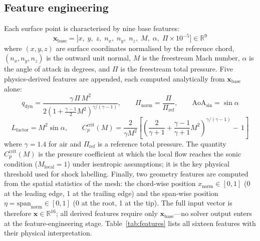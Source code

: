 \documentclass{WCCM-ECCOMAS_2026_Full_Paper}
\begin{document}
\subsection{Feature engineering}

Each surface point is characterised by nine base features:
\begin{equation}
  \mathbf{x}_{\mathrm{base}}
  = \bigl[x,\;y,\;z,\;n_x,\;n_y,\;n_z,\;M,\;\alpha,\;
          \Pi{\times}10^{-5}\bigr]
  \in \mathbb{R}^{9}
  \label{eq:xbase}
\end{equation}
where $(x,y,z)$ are surface coordinates normalised by the reference
chord, $(n_x,n_y,n_z)$ is the outward unit normal, $M$ is the
freestream Mach number, $\alpha$ is the angle of attack in degrees,
and $\Pi$ is the freestream total pressure.  Five physics-derived
features are appended, each computed analytically from
$\mathbf{x}_{\mathrm{base}}$ alone:
\begin{equation}
  q_{\mathrm{dyn}} = \frac{\gamma\,\Pi\,M^{2}}
    {2\!\left(1+\tfrac{\gamma-1}{2}M^{2}\right)^{\!\gamma/(\gamma-1)}},
  \qquad
  \Pi_{\mathrm{norm}} = \frac{\Pi}{\Pi_{\mathrm{ref}}},
  \qquad
  \mathrm{AoA}_{\sin} = \sin\alpha
  \label{eq:derived1}
\end{equation}
\begin{equation}
  L_{\mathrm{factor}} = M^{2}\sin\alpha,
  \qquad
  C_{p}^{\mathrm{crit}}(M) =
    \frac{2}{\gamma M^{2}}\!\left[
      \left(\frac{2}{\gamma+1}+\frac{\gamma-1}{\gamma+1}M^{2}\right)^{\!\!
        \gamma/(\gamma-1)}\!\!\!-\,1\right]
  \label{eq:cpcrit}
\end{equation}
where $\gamma = 1.4$ for air and $\Pi_{\mathrm{ref}}$ is a reference
total pressure.  The quantity $C_{p}^{\mathrm{crit}}(M)$ is the
pressure coefficient at which the local flow reaches the sonic
condition ($M_{\mathrm{local}}=1$) under isentropic assumptions; it
is the key physical threshold used for shock labelling.  Finally, two
geometry features are computed from the spatial statistics of the
mesh: the chord-wise position $x_{\mathrm{norm}}\in[0,1]$ (0 at the
leading edge, 1 at the trailing edge) and the span-wise position
$\eta = \mathrm{span}_{\mathrm{norm}}\in[0,1]$ (0 at the root, 1 at
the tip).  The full input vector is therefore
$\mathbf{x}\in\mathbb{R}^{16}$; all derived features require only
$\mathbf{x}_{\mathrm{base}}$---no solver output enters at the
feature-engineering stage.  Table~\ref{tab:features} lists all
sixteen features with their physical interpretation.
\end{document}
